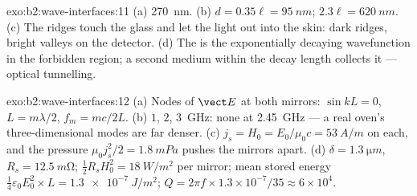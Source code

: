 \begin{solution}{exo:b2:wave-interfaces:11}
(a) \qty{270}{nm}. (b) $d = 0.35\ell = \qty{95}{nm}$; $2.3\ell = \qty{620}{nm}$. (c) The
ridges touch the glass and let the light out into the skin: dark
ridges, bright valleys on the detector. (d) The  is the
exponentially decaying wavefunction in the forbidden region; a second
medium within the decay length collects it --- optical tunnelling.
\end{solution}

\begin{solution}{exo:b2:wave-interfaces:12}
(a) Nodes of $\vect E$ at both mirrors: $\sin kL = 0$, $L = m\lambda/2$, $f_m = mc/2L$.
(b) $1$, $2$, \qty{3}{GHz}: none at \qty{2.45}{GHz} --- a real oven's
three-dimensional modes are far denser. (c) $j_s = H_0 = E_0/\mu_0c = \qty{53}{A/m}$
on each, and the pressure $\mu_0j_s^2/2 = \qty{1.8}{mPa}$ pushes the mirrors
apart. (d) $\delta = \qty{1.3}{\micro m}$, $R_s = \qty{12.5}{m\ohm}$; $\tfrac12R_sH_0^2 =
\qty{18}{W/m^2}$ per mirror; mean stored energy $\tfrac14\varepsilon_0E_0^2 \times L = \qty{1.3e-7}{J/m^2}$;
$Q = 2\pi f \times 1.3 \times 10^{-7}/35 \approx 6 \times 10^4$.
\end{solution}

